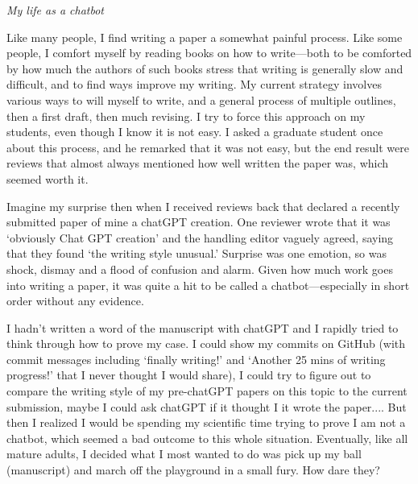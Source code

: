 \documentclass[11pt]{article}
\begin{document}

\renewcommand{\refname}{\CHead{}}


\emph{My life as a chatbot}%


Like many people, I find writing a paper a somewhat painful process. %
Like some people, I comfort myself by reading books on how to write---both to be comforted by how much the authors of such books stress that writing is generally slow and difficult, and to find ways improve my writing. My current strategy involves various ways to will myself to write, and a general process of multiple outlines, then a first draft, then much revising. I try to force this approach on my students, even though I know it is not easy. I asked a graduate student once about this process, and he remarked that it was not easy, but the end result were reviews that almost always mentioned how well written the paper was, which seemed worth it. 

Imagine my surprise then when I received reviews back that declared a recently submitted paper of mine a chatGPT creation. One reviewer wrote that it was `obviously Chat GPT creation' and the handling editor vaguely agreed, saying that they found `the writing style unusual.' Surprise was one emotion, so was shock, dismay and a flood of confusion and alarm. Given how much work goes into writing a paper, it was quite a hit to be called a chatbot---especially in short order without any evidence. 

I hadn't written a word of the manuscript with chatGPT and I rapidly tried to think through how to prove my case. I could show my commits on GitHub (with commit messages including `finally writing!' and `Another 25 mins of writing progress!' that I never thought I would share), I could try to figure out to compare the writing style of my pre-chatGPT papers on this topic to the current submission, maybe I could ask chatGPT if it thought I it wrote the paper.... But then I realized I would be spending my scientific time trying to prove I am not a chatbot, which seemed a bad outcome to this whole situation. Eventually,  like all mature adults, I decided what I most wanted to do was pick up my ball (manuscript) and march off the playground in a small fury. How dare they? 
\end{document}
